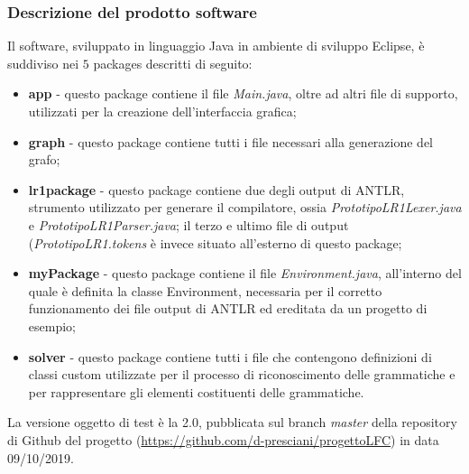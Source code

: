 \documentclass[12pt]{article}
\begin{document}
\subsubsection{Descrizione del prodotto software}
Il software, sviluppato in linguaggio Java in ambiente di sviluppo Eclipse, è suddiviso nei $5$ packages descritti di seguito:
\begin{itemize}
\item \textbf{app} - questo package contiene il file \textit{Main.java}, oltre ad altri file di supporto, utilizzati per la creazione dell'interfaccia grafica;
\item \textbf{graph} - questo package contiene tutti i file necessari alla generazione del grafo;
\item \textbf{lr1package} - questo package contiene due degli output di ANTLR, strumento utilizzato per generare il compilatore, ossia \textit{PrototipoLR1Lexer.java} e \textit{PrototipoLR1Parser.java}; il terzo e ultimo file di output (\textit{PrototipoLR1.tokens} è invece situato all'esterno di questo package;
\item \textbf{myPackage} - questo package contiene il file \textit{Environment.java}, all'interno del quale è definita la classe Environment, necessaria per il corretto funzionamento dei file output di ANTLR ed ereditata da un progetto di esempio;
\item \textbf{solver} - questo package contiene tutti i file che contengono definizioni di classi custom utilizzate per il processo di riconoscimento delle grammatiche e per rappresentare gli elementi costituenti delle grammatiche.
\end{itemize}
La versione oggetto di test è la 2.0, pubblicata sul branch \textit{master} della repository di Github del progetto (\url{https://github.com/d-presciani/progettoLFC}) in data 09/10/2019.
\pagebreak
\end{document}
